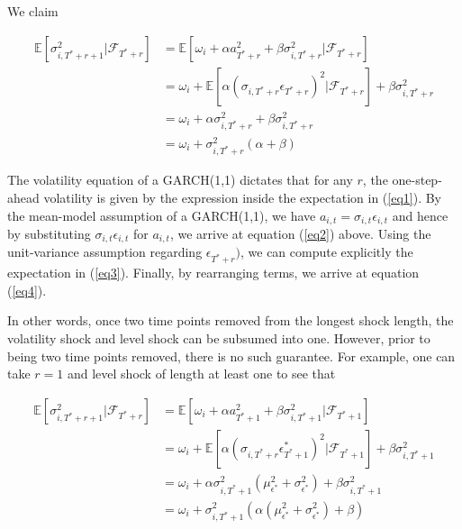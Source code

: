 \documentclass[11pt]{article}
\theoremstyle{definition}
\newenvironment{proof-of-proposition}[1][{}]{\noindent{\bf
    Proof of Proposition {#1}}
  \hspace*{.5em}}{\qed\bigskip\\}
\begin{document}
\begin{proof-of-proposition}
We claim

\begin{align}
\mathbb{E}[ \sigma^{2}_{i,T^{*}+r+1} |\mathcal{F}_{T^{*}+r}] & = \mathbb{E}[\omega_{i} + \alpha a_{T^{*}+r}^{2} + \beta\sigma^{2}_{i,T^{*}+r} |\mathcal{F}_{T^{*}+r}] \label{eq1}\\
& = \omega_{i} + \mathbb{E}[\alpha(\sigma_{i,T^{*}+r}\epsilon_{T^{*}+r})^{2} |\mathcal{F}_{T^{*}+r}] + \beta\sigma^{2}_{i,T^{*}+r} \label{eq2}\\
& = \omega_{i} + \alpha\sigma_{i,T^{*}+r}^{2} + \beta\sigma^{2}_{i,T^{*}+r} \label{eq3}\\
& = \omega_{i} + \sigma^{2}_{i,T^{*}+r}(\alpha + \beta) \label{eq4}
\end{align}

The volatility equation of a GARCH(1,1) dictates that for any $r$, the one-step-ahead volatility is given by the expression inside the expectation in (\ref{eq1}).  By the mean-model assumption of a GARCH(1,1), we have $a_{i,t} = \sigma_{i,t}\epsilon_{i,t}$ and hence by substituting $\sigma_{i,t}\epsilon_{i,t}$ for $a_{i,t}$, we arrive at equation (\ref{eq2}) above.  Using the unit-variance assumption regarding $\epsilon_{T^{*}+r})$, we can compute explicitly the expectation in (\ref{eq3}).  Finally, by rearranging terms, we arrive at equation (\ref{eq4}).
\end{proof-of-proposition}

In other words, once two time points removed from the longest shock length, the volatility shock and level shock can be subsumed into one.  However, prior to being two time points removed, there is no such guarantee.  For example, one can take $r = 1$ and level shock of length at least one to see that 

\begin{align}
\mathbb{E}[ \sigma^{2}_{i,T^{*}+r+1} |\mathcal{F}_{T^{*}+r}] & = \mathbb{E}[\omega_{i} + \alpha a_{T^{*}+1}^{2} + \beta\sigma^{2}_{i,T^{*}+1} |\mathcal{F}_{T^{*}+1}] \\
& = \omega_{i} + \mathbb{E}[\alpha(\sigma_{i,T^{*}+r}\epsilon^{*}_{T^{*}+1})^{2} |\mathcal{F}_{T^{*}+1}] + \beta\sigma^{2}_{i,T^{*}+1} \\
& = \omega_{i} + \alpha\sigma^{2}_{i,T^{*}+1}(\mu^{2}_{\epsilon^{*}} + \sigma^{2}_{\epsilon^{*}}) + \beta\sigma^{2}_{i,T^{*}+1} \\
& = \omega_{i} + \sigma^{2}_{i,T^{*}+1}(\alpha(\mu^{2}_{\epsilon^{*}} + \sigma^{2}_{\epsilon^{*}}) + \beta)
\end{align}
\end{document}
